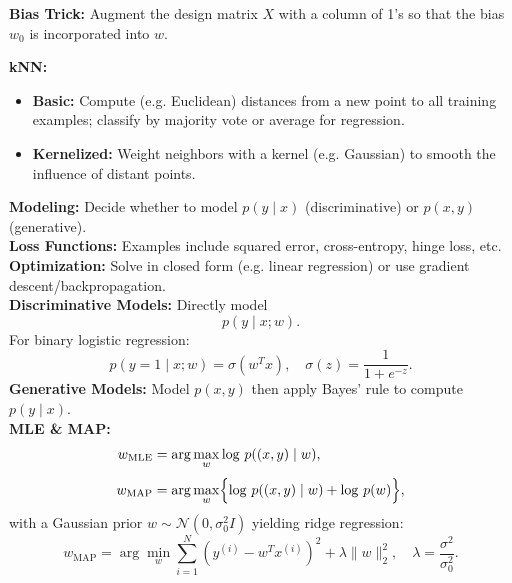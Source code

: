 \documentclass[10pt]{article}
\begin{document}
\footnotesize
\begin{multicols}{2}


\begin{tcolorbox}[title=Supervised Learning Organization]
\textbf{Bias Trick:} Augment the design matrix \(X\) with a column of 1’s so that the bias \(w_0\) is incorporated into \(w\).

\textbf{kNN:}
\begin{itemize}[noitemsep, topsep=0pt]
    \item \textbf{Basic:} Compute (e.g. Euclidean) distances from a new point to all training examples; classify by majority vote or average for regression.
    \item \textbf{Kernelized:} Weight neighbors with a kernel (e.g. Gaussian) to smooth the influence of distant points.
\end{itemize}
\end{tcolorbox}

\begin{tcolorbox}[title=Common Patterns Across Models]
\textbf{Modeling:} Decide whether to model \(p(y\mid x)\) (discriminative) or \(p(x,y)\) (generative).\\[1mm]
\textbf{Loss Functions:} Examples include squared error, cross-entropy, hinge loss, etc.\\[1mm]
\textbf{Optimization:} Solve in closed form (e.g. linear regression) or use gradient descent/backpropagation.\\[1mm]
\textbf{Discriminative Models:} Directly model
\[
p(y\mid x;w).
\]
For binary logistic regression:
\[
p(y=1\mid x;w)=\sigma(w^T x),\quad \sigma(z)=\frac{1}{1+e^{-z}}.
\]
\textbf{Generative Models:} Model \(p(x,y)\) then apply Bayes’ rule to compute \(p(y\mid x)\).\\[1mm]
\textbf{MLE \& MAP:}\\
\[
\begin{aligned}
w_{\mathrm{MLE}} &= \arg\max_w \log\, p((x,y)\mid w),\\[1mm]
w_{\mathrm{MAP}} &= \arg\max_w \Bigl\{\log\, p((x,y)\mid w)+\log\, p(w)\Bigr\},
\end{aligned}
\]
with a Gaussian prior \(w\sim\mathcal{N}(0,\sigma_0^2 I)\) yielding ridge regression:
\[
w_{\mathrm{MAP}}=\arg\min_w \sum_{i=1}^N \left(y^{(i)}-w^T x^{(i)}\right)^2+\lambda\|w\|_2^2,\quad \lambda=\frac{\sigma^2}{\sigma_0^2}.
\]
\end{tcolorbox}


\end{multicols}
\end{document}
